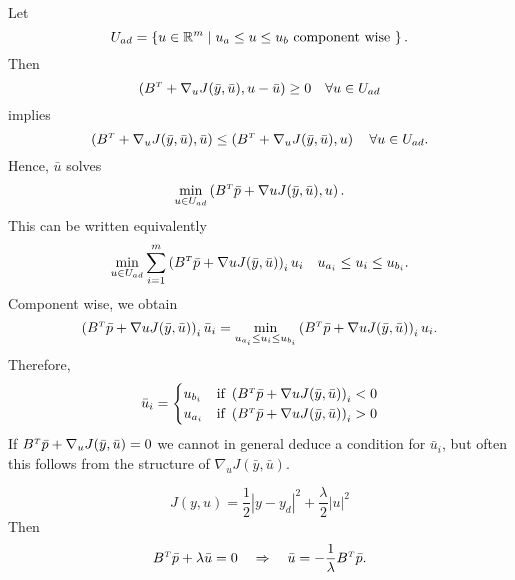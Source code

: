 \documentclass[../skript.tex]{subfiles}
\begin{document}
\begin{example}
Let
\[
U_{ad} = \left\{ u \in \mathbb{R}^m \mathrel{}\middle|\mathrel{} u_a \leq u \leq u_b \text{ component wise } \right\}.
\]
Then
\[
	\left( B^\tp + \nabla_u J(\bar{y}, \bar{u}), u - \bar{u} \right) \geq 0 \quad \forall u \in U_{ad}
\]
implies
\[
	\left( B^\tp + \nabla_u J(\bar{y}, \bar{u}), \bar{u} \right) \leq \left( B^\tp + \nabla_u J(\bar{y}, \bar{u}), u \right) \quad \forall u \in U_{ad}.
\]
Hence, $\bar{u}$ solves
\[
	\min_{u \in U_{ad}} \left( B^\tp \bar{p} + \nabla u J(\bar{y}, \bar{u}), u \right).
\]
This can be written equivalently
\[
	\min_{u \in U_{ad}} \sum_{i=1}^m \left( B^\tp \bar{p} + \nabla u J(\bar{y}, \bar{u}) \right)_i u_i \quad u_{a_i} \leq u_i \leq u_{b_i}.
\]
Component wise, we obtain
\[
	\left( B^\tp \bar{p} + \nabla u J(\bar{y}, \bar{u}) \right)_i \bar{u}_i = \min_{u_{a_i} \leq u_i \leq u_{b_i}} \left( B^\tp \bar{p} + \nabla u J(\bar{y}, \bar{u}) \right)_i u_i.
\]
Therefore,
\[
	\bar{u}_i = \begin{cases}
	u_{b_i} & \text{if } \left( B^\tp \bar{p} + \nabla u J(\bar{y}, \bar{u}) \right)_i < 0 \\
	u_{a_i} & \text{if } \left( B^\tp \bar{p} + \nabla u J(\bar{y}, \bar{u}) \right)_i > 0
	\end{cases}
\]
If $B^\tp \bar{p} + \nabla_u J(\bar{y}, \bar{u}) = 0$ we cannot in general deduce a condition for $\bar{u}_i$, but often this follows from the structure of $\nabla_u J(\bar{y}, \bar{u})$.
\begin{example}
\[
	J(y, u) = \frac{1}{2} |y -y_d|^2 + \frac{\lambda}{2} |u|^2
\]
Then
\[
	B^\tp \bar{p} + \lambda \bar{u} = 0 \quad \Rightarrow \quad \bar{u} = -\frac{1}{\lambda} B^\tp \bar{p}.
\]
\end{example}
\end{example}
\end{document}
